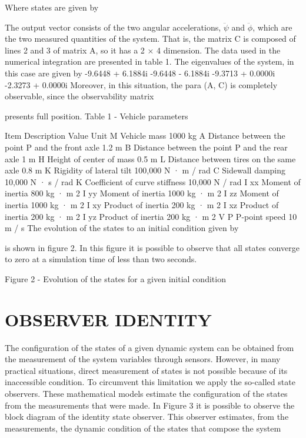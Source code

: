 \documentclass[sublist,a4paper,twoside,11pt]{article}
\begin{document}
Where states are given by

The output vector consists of the two angular accelerations, $\ddot{\psi}$ and $\ddot{\phi}$, which are the two measured quantities of the system. That is, the matrix C is composed of lines 2 and 3 of matrix A, so it has a 2 × 4 dimension.
The data used in the numerical integration are presented in table 1. The eigenvalues of the system, in this case are given by
-9.6448 + 6.1884i
-9.6448 - 6.1884i
-9.3713 + 0.0000i
-2.3273 + 0.0000i
Moreover, in this situation, the para (A, C) is completely observable, since the observability matrix

presents full position.
Table 1 - Vehicle parameters

Item Description Value Unit
M Vehicle mass 1000 kg
A Distance between the point P and the front axle 1.2 m
B Distance between the point P and the rear axle 1 m
H Height of center of mass 0.5 m
L Distance between tires on the same axle 0.8 m
K Rigidity of lateral tilt 100,000 N · m / rad
C Sidewall damping 10,000 N · s / rad
K Coefficient of curve stiffness 10,000 N / rad
I xx Moment of inertia 800 kg · m 2
I yy Moment of inertia 1000 kg · m 2
I zz Moment of inertia 1000 kg · m 2
I xy Product of inertia 200 kg · m 2
I xz Product of inertia 200 kg · m 2
I yz Product of inertia 200 kg · m 2
V P P-point speed 10 m / s
The evolution of the states to an initial condition given by

is shown in figure 2. In this figure it is possible to observe that all states converge to zero at a simulation time of less than two seconds.

Figure 2 - Evolution of the states for a given initial condition

\section{OBSERVER IDENTITY}
The configuration of the states of a given dynamic system can be obtained from the measurement of the system variables through sensors. However, in many practical situations, direct measurement of states is not possible because of its inaccessible condition. To circumvent this limitation we apply the so-called state observers. These mathematical models estimate the configuration of the states from the measurements that were made. In Figure 3 it is possible to observe the block diagram of the identity state observer. This observer estimates, from the measurements, the dynamic condition of the states that compose the system 
\end{document}
